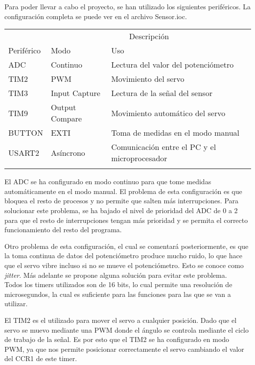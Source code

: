 \documentclass[a4paper, 12pt]{article}
\begin{document}
Para poder llevar a cabo el proyecto, se han utilizado los siguientes periféricos. La configuración completa se puede ver en el archivo Sensor.ioc.

\renewcommand{\arraystretch}{1.9}

\begin{center}
  \setlength{\tabcolsep}{30pt}
  \begin{tabularx}{\textwidth}{m{1em} m{5.6em} X}
    \firsthline
    & \multicolumn{2}{c}{Descripción} \\
    \cline{2-3}
    Periférico & Modo & Uso \\
    \hline
  
    ADC & Continuo & Lectura del valor del potenciómetro\\
    TIM2 & PWM & Movimiento del servo\\
    TIM3 & Input Capture & Lectura de la señal del sensor\\
    TIM9 & Output Compare & Movimiento automático del servo\\
    BUTTON & EXTI & Toma de medidas en el modo manual\\
    USART2 & Asíncrono & Comunicación entre el PC y el microprocesador\\
\lasthline
\end{tabularx}
\label{item:recursos}
\end{center}

El ADC se ha configurado en modo continuo para que tome medidas automáticamente en el modo manual. El problema de esta configuración es que bloquea el resto de procesos y no permite que salten más interrupciones. Para solucionar este problema, se ha bajado el nivel de prioridad del ADC de 0 a 2 para que el resto de interrupciones tengan más prioridad y se permita el correcto funcionamiento del resto del programa.

Otro problema de esta configuración, el cual se comentará posteriormente, es que la toma continua de datos del potenciómetro produce mucho ruido, lo que hace que el servo vibre incluso si no se mueve el potenciómetro. Esto se conoce como \textit{jitter}. Más adelante se propone alguna solución para evitar este problema.\\

Todos los timers utilizados son de 16 bits, lo cual permite una resolución de microsegundos, la cual es suficiente para las funciones para las que se van a utilizar. 

El TIM2 es el utilizado para mover el servo a cualquier posición. Dado que el servo se muevo mediante una PWM donde el ángulo se controla mediante el ciclo de trabajo de la señal. Es por esto que el TIM2 se ha configurado en modo PWM, ya que nos permite posicionar correctamente el servo cambiando el valor del CCR1 de este timer.\\
\end{document}
